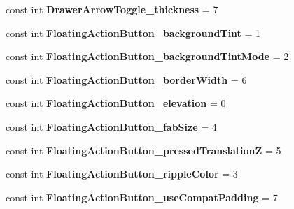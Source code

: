 \begin{DoxyCompactItemize}
\item 
\mbox{\label{classXaria_1_1Resource_1_1Styleable_a563cb0e76a53ace258bece07f56750f5}} 
const int {\bfseries Drawer\+Arrow\+Toggle\+\_\+thickness} = 7
\item 
\mbox{\label{classXaria_1_1Resource_1_1Styleable_a6dbfe3c453133dd271d0ffbeefecf0ec}} 
const int {\bfseries Floating\+Action\+Button\+\_\+background\+Tint} = 1
\item 
\mbox{\label{classXaria_1_1Resource_1_1Styleable_a2432e78aebed631db2b14ed00707c83e}} 
const int {\bfseries Floating\+Action\+Button\+\_\+background\+Tint\+Mode} = 2
\item 
\mbox{\label{classXaria_1_1Resource_1_1Styleable_af9e50f676b1e1fa63436757c64fba13f}} 
const int {\bfseries Floating\+Action\+Button\+\_\+border\+Width} = 6
\item 
\mbox{\label{classXaria_1_1Resource_1_1Styleable_ab91f5aaae807018a4666e7b0e7855271}} 
const int {\bfseries Floating\+Action\+Button\+\_\+elevation} = 0
\item 
\mbox{\label{classXaria_1_1Resource_1_1Styleable_a20e24f79136134e10a1b4ac6847f0122}} 
const int {\bfseries Floating\+Action\+Button\+\_\+fab\+Size} = 4
\item 
\mbox{\label{classXaria_1_1Resource_1_1Styleable_ae6e5cff3cca228bada40da0968e8f61c}} 
const int {\bfseries Floating\+Action\+Button\+\_\+pressed\+TranslationZ} = 5
\item 
\mbox{\label{classXaria_1_1Resource_1_1Styleable_ac63a661dd391e11ad259fd94b43db761}} 
const int {\bfseries Floating\+Action\+Button\+\_\+ripple\+Color} = 3
\item 
\mbox{\label{classXaria_1_1Resource_1_1Styleable_a2b4f39c29191a020b0eec3ab36ba9701}} 
const int {\bfseries Floating\+Action\+Button\+\_\+use\+Compat\+Padding} = 7
\item 

\end{DoxyCompactItemize}
